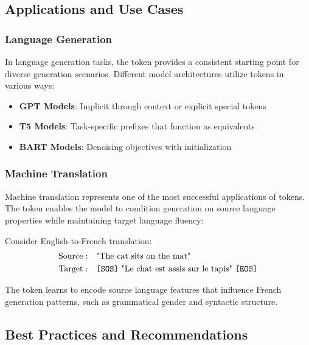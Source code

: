 \subsection{Applications and Use Cases}

\subsubsection{Language Generation}

In language generation tasks, the \sos{} token provides a consistent starting point for diverse generation scenarios. Different model architectures utilize \sos{} tokens in various ways:

\begin{itemize}
\item \textbf{GPT Models}: Implicit \sos{} through context or explicit special tokens
\item \textbf{T5 Models}: Task-specific prefixes that function as \sos{} equivalents
\item \textbf{BART Models}: Denoising objectives with \sos{} initialization
\end{itemize}

\subsubsection{Machine Translation}

Machine translation represents one of the most successful applications of \sos{} tokens. The token enables the model to condition generation on source language properties while maintaining target language fluency:

\begin{example}
Consider English-to-French translation:
\begin{align}
\text{Source}: &\quad \text{"The cat sits on the mat"} \\
\text{Target}: &\quad \text{\texttt{[SOS]}{} "Le chat est assis sur le tapis" \texttt{[EOS]}{}}
\end{align}

The \sos{} token learns to encode source language features that influence French generation patterns, such as grammatical gender and syntactic structure.
\end{example}

\subsection{Best Practices and Recommendations}

